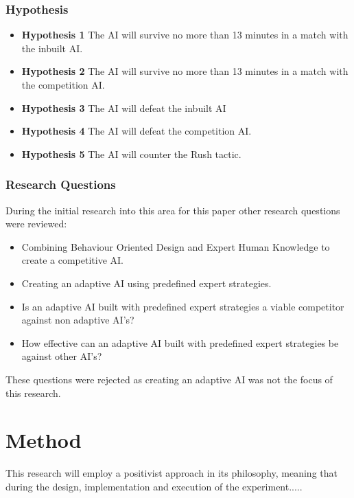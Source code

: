 \documentclass[journal]{IEEEtran}
\begin{document}
\subsubsection{Hypothesis}
\begin{itemize}
	\item \textbf{Hypothesis 1} The AI will survive no more than 13 minutes in a match with the inbuilt AI.
	\item \textbf{Hypothesis 2} The AI will survive no more than 13 minutes in a match with the competition AI.
	\item \textbf{Hypothesis 3} The AI will defeat the inbuilt AI
	\item \textbf{Hypothesis 4} The AI will defeat the competition AI.
	\item \textbf{Hypothesis 5} The AI will counter the Rush tactic.
\end{itemize}

\subsubsection{Research Questions}
During the initial research into this area for this paper other research questions were reviewed:
\begin{itemize}
	\item Combining Behaviour Oriented Design and Expert Human Knowledge to create a competitive AI.
	
	\item Creating an adaptive AI using predefined expert strategies. 
	
	\item Is an adaptive AI built with predefined expert strategies a viable competitor against non adaptive AI’s?
	
	\item How effective can an adaptive AI built with predefined expert strategies be against other AI’s?	
\end{itemize}
These questions were rejected as creating an adaptive AI was not the focus of this research.
\newline

\section{Method}


This research will employ a positivist approach in its philosophy, meaning that during the design, implementation and execution of the experiment.....
\end{document}
